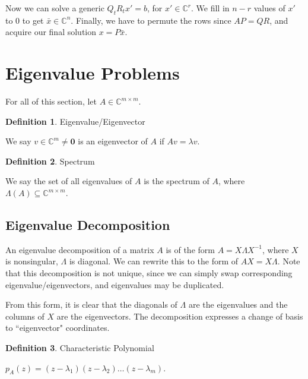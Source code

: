 \documentclass{article}
\theoremstyle{definition}
\newtheorem{definition}{Definition}[section]
\begin{document}
Now we can solve a generic $Q_t R_t x' = b$, for $x' \in \mathbb{C}^{r}$. We fill in $n-r$ values of $x'$ to $0$ to get $\bar{x} \in \mathbb{C}^{n}$. Finally, we have to permute the rows since $A P = QR$, and acquire our final solution $x = P \bar{x}$.

\pagebreak

\section{Eigenvalue Problems}

For all of this section, let $A \in \mathbb{C}^{m \times m}$. \newline

\begin{definition}{Eigenvalue/Eigenvector}

We say $v \in \mathbb{C}^m \neq \textbf{0}$ is an eigenvector of $A$ if $Av = \lambda v$.

\end{definition}

\vspace{3ex}
\begin{definition}{Spectrum}

We say the set of all eigenvalues of $A$ is the spectrum of $A$, where $\Lambda(A) \subseteq \mathbb{C}^{m \times m}$.

\end{definition}

\subsection{Eigenvalue Decomposition}

An eigenvalue decomposition of a matrix $A$ is of the form $A = X \Lambda X^{-1}$, where $X$ is nonsingular, $\Lambda$ is diagonal. We can rewrite this to the form of $AX = X \Lambda$. Note that this decomposition is not unique, since we can simply swap corresponding eigenvalue/eigenvectors, and eigenvalues may be duplicated.

From this form, it is clear that the diagonals of $\Lambda$ are the eigenvalues and the columns of $X$ are the eigenvectors. The decomposition expresses a change of basis to ``eigenvector" coordinates. \newline

\begin{definition}{Characteristic Polynomial}

$p_A(z) = (z - \lambda_1) (z - \lambda_2) \dots (z - \lambda_m)$.

\end{definition}
\end{document}
